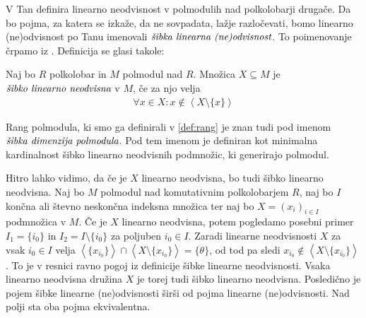 \documentclass[mat1]{fmfdelo}
\newcommand{\pojem}[1]{\ensuremath{\emph{#1}}}
\newcommand{\Gen}[1]{\ensuremath{\left<{#1}\right>}}
\begin{document}
V \cite[definicija 2.\,3.\,]{bib:Tanbase} Tan definira linearno neodvisnost v polmodulih nad polkolobarji drugače. Da bo pojma, za katera se izkaže, da ne sovpadata, lažje razločevati, bomo linearno (ne)odvisnost po Tanu imenovali \pojem{šibka linearna (ne)odvisnost}. To poimenovanje črpamo iz \cite[definicija 2. 12.]{bib:AkianTropSemi}. Definicija se glasi takole:
\begin{definicija}\label{def:linneodv2}
	Naj bo $R$ polkolobar in $M$ polmodul nad $R$. Množica $X\subseteq M$ je \pojem{šibko linearno neodvisna} v $M$, če za njo velja
\begin{align*}
	\forall x\in X: x \notin \Gen{X\setminus\{x\}}
\end{align*}
\end{definicija}
\begin{opomba}
	 Rang polmodula, ki smo ga definirali v \ref{def:rang} je znan tudi pod imenom \pojem{šibka dimenzija polmodula}. Pod tem imenom je definiran kot minimalna kardinalnost šibko linearno neodvisnih podmnožic, ki generirajo polmodul.
\end{opomba}
Hitro lahko vidimo, da če je $X$ linearno neodvisna, bo tudi šibko linearno neodvisna. Naj bo $M$ polmodul nad komutativnim polkolobarjem $R$, naj bo $I$ končna ali števno neskončna indeksna množica ter naj bo $X = (x_i)_{i\in I}$ podmnožica v $M$. 
Če je $X$ linearno neodvisna, potem pogledamo posebni primer $I_1 = \{i_0\}$ in $I_2 = I\setminus\{i_0\}$ za poljuben $i_0\in I$. Zaradi linearne neodvisnosti $X$ za vsak $i_0 \in I$ velja $\Gen{\{x_{i_0}\}}\cap \Gen{X\setminus\{x_{i_0}\}} = \{\theta\}$, od tod pa sledi $x_{i_0}\notin \Gen{X\setminus\{x_{i_0}\}}$. To je v resnici ravno pogoj iz definicije šibke linearne neodvisnosti. Vsaka linearno neodvisna družina $X$ je torej tudi šibko linearno neodvisna. Posledično je pojem šibke linearne (ne)odvisnosti širši od pojma linearne (ne)odvisnosti. Nad polji sta oba pojma ekvivalentna.
\end{document}
